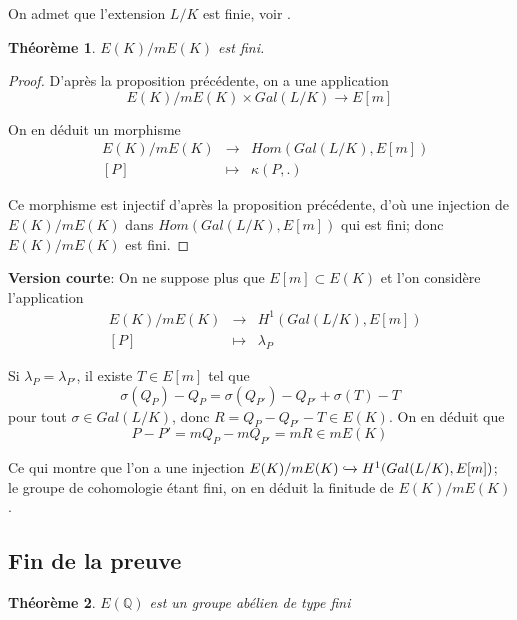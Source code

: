 \documentclass{article}
\newtheorem{theoreme}{Théorème}
\begin{document}
On admet que l'extension $L/K$ est finie, voir \cite{silverman_arithmetic_2009}.

\begin{theoreme}
$E(K)/mE(K)$ est fini.
\end{theoreme}

\begin{proof}
D'après la proposition précédente, on a une application
\begin{equation*}
E(K)/mE(K) \times Gal(L/K) \longrightarrow E[m]
\end{equation*}

On en déduit un morphisme
\begin{equation*}
\begin{array}{lrcl}
&E(K)/mE(K) & \longrightarrow & Hom(Gal(L/K), E[m]) \\
	 & [P] & \longmapsto & \kappa(P, .)
\end{array}
\end{equation*}

Ce morphisme est injectif d'après la proposition précédente, d'où une injection de $E(K)/mE(K)$ dans
$Hom(Gal(L/K), E[m])$ qui est fini; donc $E(K)/mE(K)$ est fini.
\end{proof}

\textbf{Version courte}: On ne suppose plus que $E[m] \subset E(K)$ et l'on considère l'application
\begin{equation*}
\begin{array}{lrcl}
&E(K)/mE(K) & \longrightarrow & H^1(Gal(L/K), E[m]) \\
	 & [P] & \longmapsto & \lambda_{P}
\end{array}
\end{equation*}

Si $\lambda_{P} = \lambda_{P'}$, il existe $T\in E[m]$ tel que
\begin{equation*}
\sigma(Q_{P}) - Q_{P} = \sigma(Q_{P'}) - Q_{P'} + \sigma(T) - T
\end{equation*}
pour tout $\sigma \in Gal(L/K)$, donc $R = Q_{P} - Q_{P'} - T \in E(K)$. On en déduit que
\begin{equation*}
P-P' = mQ_{P} - mQ_{P'} = mR \in mE(K)
\end{equation*}

Ce qui montre que l'on a une injection $E(K)/mE(K) \xhookrightarrow{} H^1(Gal(L/K), E[m])$; le groupe de cohomologie étant fini, on en déduit la finitude de $E(K)/mE(K)$.

\subsection{Fin de la preuve}
\begin{theoreme}
$E(\mathbb{Q})$ est un groupe abélien de type fini
\end{theoreme}
\end{document}
